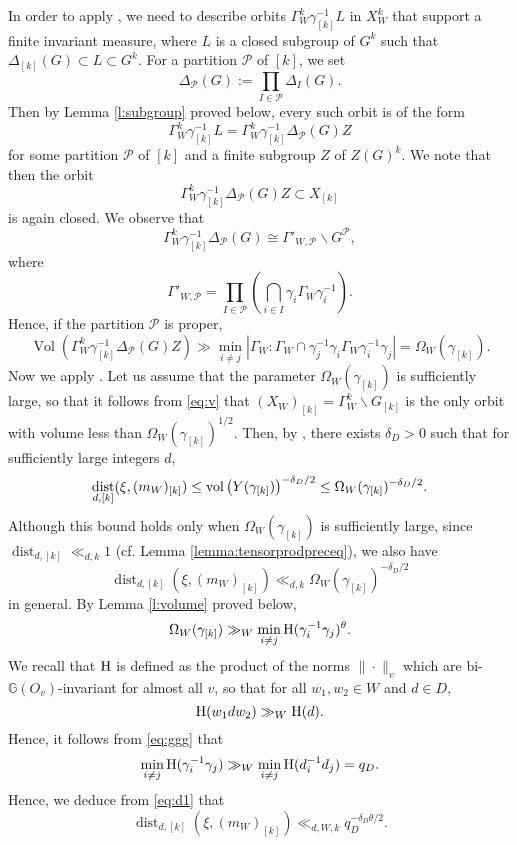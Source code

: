 \documentclass[11pt,reqno,a4paper]{amsart}
\numberwithin{equation}{section}
\newcommand{\cP}{\mathcal{P}}
\newcommand{\bG}{\mathbb{G}}
\DeclareMathOperator{\dist}{dist}
\DeclareMathOperator{\Vol}{Vol}
\theoremstyle{theorem}
\theoremstyle{definition}
\begin{document}
In order to apply \cite[Theorem~1.3]{EMV}, we need to describe orbits $\Gamma_W^k \gamma_{[k]}^{-1} L$
in $X_W^k$ that support a finite invariant measure, where $L$ is a closed subgroup of $G^k$
such that $\Delta_{[k]}(G)\subset L\subset G^k$.
For a partition $\mathcal{P}$ of $[k]$, we set
$$
\Delta_{\mathcal{P}}(G):=\prod_{I\in \mathcal{P}} \Delta_I(G).
$$
Then by Lemma \ref{l:subgroup} proved below, every such orbit is of the form
\begin{equation}\label{eq:orb}
\Gamma_W^k \gamma_{[k]}^{-1} L=\Gamma_W^k \gamma_{[k]}^{-1} \Delta_{\mathcal{P}}(G)Z
\end{equation}
for some partition $\mathcal{P}$ of $[k]$ and a finite subgroup $Z$ of $Z(G)^k$.
We note that then the orbit 
$$
\Gamma_W^{k}\gamma_{[k]}^{-1}\Delta_{\mathcal{P}}(G)Z \subset X_{[k]}
$$ is 
again closed. We observe that
$$
\Gamma_W^{k}\gamma_{[k]}^{-1}\Delta_{\mathcal{P}}(G) \cong \Gamma'_{W,\cP} \backslash G^\cP,
$$ 
where 
\[
\Gamma'_{W,\cP} 
=\prod_{I\in \mathcal{P}} \left(\bigcap_{i\in I} \gamma_i \Gamma_W \gamma_i^{-1}\right).
\]
Hence, if the partition $\mathcal{P}$ is proper,
\begin{equation}\label{eq:v}
\Vol(\Gamma_W^{k}\gamma_{[k]}^{-1}\Delta_{\mathcal{P}}(G)Z) \gg \min_{i \neq j} |\Gamma_W :  \Gamma_W \cap \gamma_j^{-1} \gamma_i \Gamma_W \gamma_i^{-1} \gamma_j| = \Omega_W(\gamma_{[k]}).
\end{equation}
Now we apply \cite[Theorem~1.3]{EMV}. Let us assume that the parameter $\Omega_W(\gamma_{[k]})$ is sufficiently large, so that
it follows from \eqref{eq:v} that $(X_W)_{[k]}=\Gamma_W^{k}\backslash G_{[k]}$
is the only orbit with volume less than $\Omega_W(\gamma_{[k]})^{1/2}$.
Then, by \cite[Theorem~1.3]{EMV}, there exists $\delta_D > 0$ such that
for sufficiently large integers $d$,
\begin{equation}\label{eq:d1}
\dist_{d,[k]}(\xi,(m_W)_{[k]}) \le \hbox{vol}\left(Y(\gamma_{[k]})\right)^{-\delta_D/2} \le  \Omega_W(\gamma_{[k]})^{-\delta_D/2}.
\end{equation}
Although this bound holds only when $\Omega_W(\gamma_{[k]})$
is sufficiently large, since $\dist_{d,[k]}\ll_{d,k} 1$ (cf. Lemma \ref{lemma:tensorprodpreceq}),
we also have 
\[
\dist_{d,[k]}(\xi,(m_W)_{[k]}) \ll_{d,k}  \Omega_W(\gamma_{[k]})^{-\delta_D/2}
\]
in general. By Lemma \ref{l:volume} proved below,
\begin{equation}
\label{eq:omega}
\Omega_W(\gamma_{[k]})\gg_W \min_{i\ne j}\hbox{H}(\gamma_i^{-1}\gamma_j)^\theta .
\end{equation}
We recall that $\hbox{H}$ is defined as the product of the norms $\|\cdot\|_v$
which are bi-$\bG(O_v)$-invariant for almost all $v$, so that
for all $w_1,w_2\in W$ and $d\in D$,
$$
\hbox{H}(w_1dw_2)\gg_W \hbox{H}(d).
$$
Hence, it follows from \eqref{eq:ggg} that
$$
\min_{i\ne j}\hbox{H}(\gamma_i^{-1}\gamma_j) \gg_W  \min_{i\ne j} \hbox{H}(d_i^{-1}d_j) =q_D.
$$
Hence, we deduce from \eqref{eq:d1} that 
\begin{equation}
\label{effcongmix1}
\dist_{d,[k]}(\xi,(m_W)_{[k]}) \ll_{d,W,k} q_D^{-\delta_D \theta/2}.
\end{equation}
\end{document}
